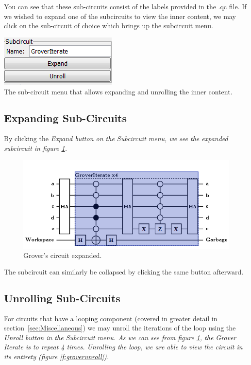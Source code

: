 \documentclass[10pt]{article}
\theoremstyle{definition}
\begin{document}
You can see that these sub-circuits consist of the labels provided in the .qc file. If we wished to expand one of the subcircuits to view the inner content, we may click on the sub-circuit of choice which brings up the subcircuit menu.

\begin{center}
\includegraphics{Figures/SubCircuits/SubCircuitMenu.png} \\
The sub-circuit menu that allows expanding and unrolling the inner content.
\end{center}

\subsection{Expanding Sub-Circuits}\label{sec:ExpandingSubCircuits}

By clicking the \em Expand \em button on the \em Subcircuit \em menu, we see the expanded subcircuit in figure \ref{f:groverex}.

\begin{figure}
\capstart
\centering
\includegraphics[scale=.5]{Figures/SubCircuits/GroverCircuitExpand}
\caption{Grover's circuit expanded.}
\label{f:groverex}
\end{figure}

The subcircuit can similarly be collapsed by clicking the same button afterward.


\subsection{Unrolling Sub-Circuits}\label{sec:UnrollingSubCircuits}

For circuits that have a looping component (covered in greater detail in section~\ref{sec:Miscellaneous}) we may unroll the iterations of the loop using the \em Unroll \em button in the \em Subcircuit \em menu. As we can see from figure \ref{f:groverex}, the Grover Iterate is to repeat 4 times. Unrolling the loop, we are able to view the circuit in its entirety (figure \ref{f:groverunroll}).
\end{document}
